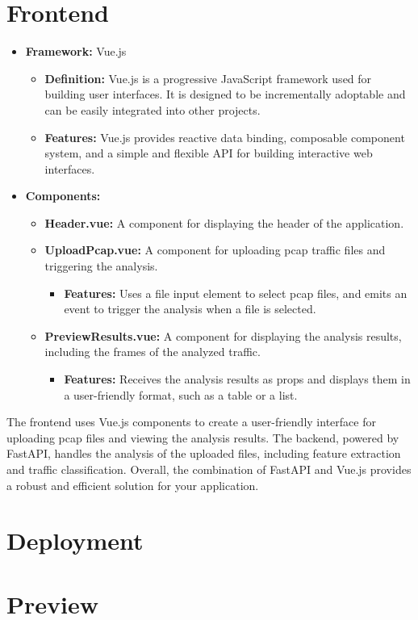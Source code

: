 \section{Frontend}
\begin{itemize}
	\item \textbf{Framework:} Vue.js
	\begin{itemize}
		\item \textbf{Definition:} Vue.js is a progressive JavaScript framework used for building user interfaces. It is designed to be incrementally adoptable and can be easily integrated into other projects.
		\item \textbf{Features:} Vue.js provides reactive data binding, composable component system, and a simple and flexible API for building interactive web interfaces.
	\end{itemize}
	\item \textbf{Components:}
	\begin{itemize}
		\item \textbf{Header.vue:} A component for displaying the header of the application.
		\item \textbf{UploadPcap.vue:} A component for uploading pcap traffic files and triggering the analysis.
		\begin{itemize}
			\item \textbf{Features:} Uses a file input element to select pcap files, and emits an event to trigger the analysis when a file is selected.
		\end{itemize}
		\item \textbf{PreviewResults.vue:} A component for displaying the analysis results, including the frames of the analyzed traffic.
		\begin{itemize}
			\item \textbf{Features:} Receives the analysis results as props and displays them in a user-friendly format, such as a table or a list.
		\end{itemize}
	\end{itemize}
\end{itemize}

The frontend uses Vue.js components to create a user-friendly interface for uploading pcap files and viewing the analysis results. The backend, powered by FastAPI, handles the analysis of the uploaded files, including feature extraction and traffic classification. Overall, the combination of FastAPI and Vue.js provides a robust and efficient solution for your application.


\section{Deployment}

\section{Preview}